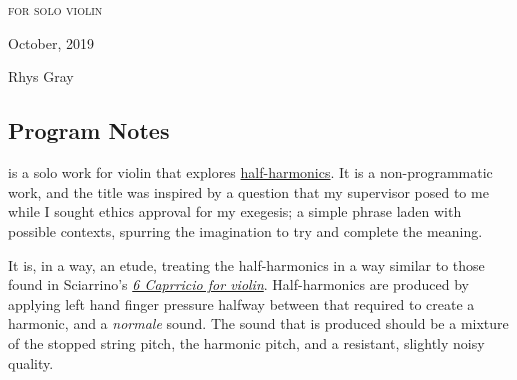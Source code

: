 \newpage

\chapter[\violinPiece]{}


\vspace*{3cm}
\begin{center}
\textsc{for solo violin}
\vspace*{3.5cm}

\HRule{0.5pt}


\LARGE \textbf{\uppercase{\violinPiece}}
\HRule{2pt}

\vspace{1.3cm}

\normalsize October, 2019
\date{}

\vspace*{5\baselineskip}

Rhys Gray

\end{center}
\newpage
\section*{Program Notes}
\violinPiece\space is a solo work for violin that explores \hyperref[sec:half-harmonics]{half-harmonics}.
It is a non-programmatic work, and the title was inspired by a question that my supervisor posed to me while I sought ethics approval for my exegesis; a simple phrase laden with possible contexts, spurring the imagination to try and complete the meaning.

It is, in a way, an etude, treating the half-harmonics in a way similar to those found in Sciarrino's \hyperref[fig:sciarrinoExcerpt]{\emph{6 Caprricio for violin}}. 
Half-harmonics are produced by applying left hand finger pressure halfway between that required to create a harmonic, and a \emph{normale} sound. 
The sound that is produced should be a mixture of the stopped string pitch, the harmonic pitch, and a resistant, slightly noisy quality.

